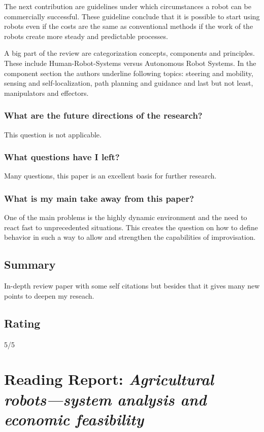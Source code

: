 \documentclass{article}
\begin{document}
The next contribution are guidelines under which circumstances a robot can be commercially successful. These guideline conclude
that it is possible to start using robots even if the costs are the same as conventional methods if the work of
the robots create more steady and predictable processes.

A big part of the review are categorization concepts, components and principles. These include Human-Robot-Systems versus
Autonomous Robot Systems. In the component section the authors underline following topics: steering and mobility, 
sensing and self-localization, path planning and guidance and last but not least, manipulators and effectors.
\subsubsection*{What are the future directions of the research?}
This question is not applicable.
\subsubsection*{What questions have I left?}
Many questions, this paper is an excellent basis for further research.
\subsubsection*{What is my main take away from this paper?}
One of the main problems is the highly dynamic environment and the need to react fast to unprecedented situations.
This creates the question on how to define behavior in such a way to allow and strengthen the capabilities of 
improvisation.
\subsection*{Summary}
In-depth review paper with some self citations but besides that it gives many new points to deepen my reseach.

\subsection*{Rating}
5/5

\section{Reading Report: \emph{Agricultural robots—system analysis and economic feasibility}}
\cite{Pedersen2006}
\end{document}
